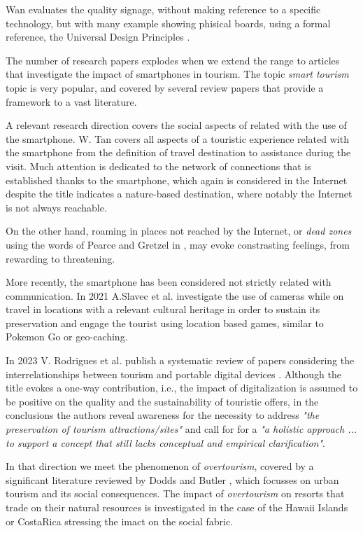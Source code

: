 \documentclass[sustainability,article,submit,pdftex,moreauthors]{Definitions/mdpi}
\begin{document}
Wan \cite{wan22a} evaluates the quality signage, without making reference to a specific technology, but with many example showing phisical boards, using a formal reference, the Universal Design Principles \cite{udi97a}.

The number of research papers explodes when we extend the range to articles that investigate the impact of smartphones in tourism. The topic {\em smart tourism} topic is very popular, and covered by several review papers that provide a framework to a vast literature.

A relevant research direction covers the social aspects of related with the use of the smartphone. W. Tan \cite{tan17a} covers all aspects of a touristic experience related with the smartphone from the definition of travel destination to assistance during the visit. Much attention is dedicated to the network of connections that is established thanks to the smartphone, which again is considered in the Internet despite the title indicates a nature-based destination, where notably the Internet is not always reachable.

On the other hand, roaming in places not reached by the Internet, or {\em dead zones} using the words of Pearce and Gretzel in \cite{pea12a}, may evoke constrasting feelings, from rewarding to threatening.

More recently, the smartphone has been considered not strictly related with communication. In 2021 A.Slavec et al. investigate the use of cameras \cite{sla21a} while on travel in locations with a relevant cultural heritage in order to sustain its preservation and engage the tourist using location based games, similar to Pokemon Go or geo-caching.

In 2023 V. Rodrigues et al. publish a systematic review of papers considering the interrelationships between tourism and portable digital devices \cite{rod23a}. Although the title evokes a one-way contribution, i.e., the impact of digitalization is assumed to be positive on the quality and the sustainability of touristic offers, in the conclusions the authors reveal awareness for the necessity to address {\em "the preservation of tourism attractions/sites"} and call for for a {\em "a holistic approach ... to support a concept that still lacks conceptual and empirical clarification"}.

In that direction we meet the phenomenon of {\em overtourism}, covered by a significant literature reviewed by Dodds and Butler \cite{dod19a}, which focusses on urban tourism and its social consequences. The impact of {\em overtourism} on resorts that trade on their natural resources is investigated in the case of the Hawaii Islands \cite{lin22a} or CostaRica \cite{mat10a} stressing the imact on the social fabric.
\end{document}
